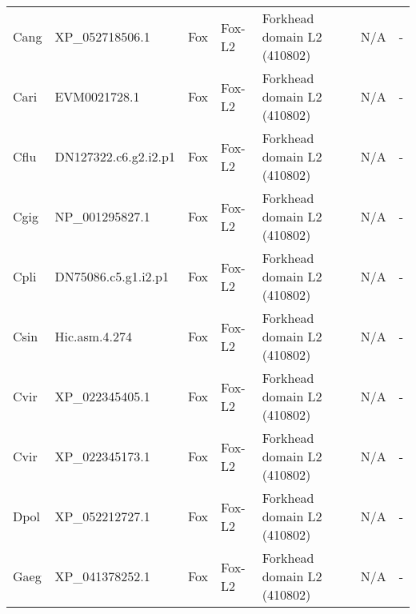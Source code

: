 \documentclass[../main.tex]{subfiles}
\begin{document}
\begin{landscape}
\begin{longtable}{lllllll}
		Cang           & XP\_052718506.1       & Fox            & Fox-L2              & Forkhead domain L2 (410802)                 & N/A                                                                    & -                    \\
		Cari           & EVM0021728.1          & Fox            & Fox-L2              & Forkhead domain L2 (410802)                 & N/A                                                                    & -                    \\
		Cflu           & DN127322.c6.g2.i2.p1  & Fox            & Fox-L2              & Forkhead domain L2 (410802)                 & N/A                                                                    & -                    \\
		Cgig           & NP\_001295827.1       & Fox            & Fox-L2              & Forkhead domain L2 (410802)                 & N/A                                                                    & -                    \\
		Cpli           & DN75086.c5.g1.i2.p1   & Fox            & Fox-L2              & Forkhead domain L2 (410802)                 & N/A                                                                    & -                    \\
		Csin           & Hic.asm.4.274         & Fox            & Fox-L2              & Forkhead domain L2 (410802)                 & N/A                                                                    & -                    \\
		Cvir           & XP\_022345405.1       & Fox            & Fox-L2              & Forkhead domain L2 (410802)                 & N/A                                                                    & -                    \\
		Cvir           & XP\_022345173.1       & Fox            & Fox-L2              & Forkhead domain L2 (410802)                 & N/A                                                                    & -                    \\
		Dpol           & XP\_052212727.1       & Fox            & Fox-L2              & Forkhead domain L2 (410802)                 & N/A                                                                    & -                    \\
		Gaeg           & XP\_041378252.1       & Fox            & Fox-L2              & Forkhead domain L2 (410802)                 & N/A                                                                    & -                    \\

\end{longtable}
\end{landscape}
\end{document}
